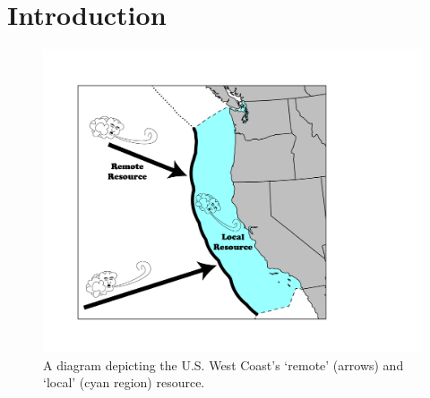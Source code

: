\section{Introduction}




\begin{figure}[ht]
    \centering
  \includegraphics[width=0.9\linewidth]{../diagram/EEZ_contour03_edit01.png}
    \caption{A diagram depicting the U.S. West Coast’s ‘remote’ (arrows) and ‘local’ (cyan region) resource.}
    \label{fig:diagram:west-eez}
  \end{figure}


